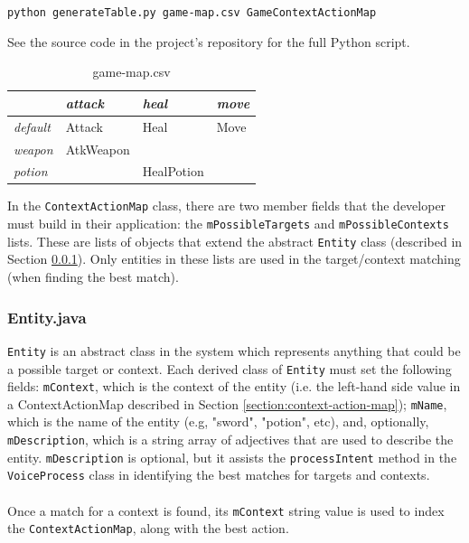 \documentclass[12pt]{article}
\begin{document}
\begin{center}
\texttt{python generateTable.py game-map.csv GameContextActionMap}
\end{center}

See the source code in the project's repository for the full Python script.

\begin{table}[H]
\centering
\caption{game-map.csv}
\label{table:game-map-csv}
\begin{tabular}{l|l|l|l|}
\cline{1-4}
\multicolumn{1}{|l|}{\textbf{}} & \textit{attack}    & \textit{heal}  & \textit{move}    \\ \hline
\multicolumn{1}{|l|}{\textit{default}} & Attack    & Heal  & Move    \\ \hline
\multicolumn{1}{|l|}{\textit{weapon}}  & AtkWeapon &            &  \\ \hline
\multicolumn{1}{|l|}{\textit{potion}}  &                & HealPotion &              \\ \hline
\end{tabular}
\end{table}

In the \texttt{ContextActionMap} class, there are two member fields that the developer must build in their application: the \texttt{mPossibleTargets} and \texttt{mPossibleContexts} lists. These are lists of objects that extend the abstract \texttt{Entity} class (described in Section \ref{section:entity}). Only entities in these lists are used in the target/context matching (when finding the best match).

\subsubsection{Entity.java}
\label{section:entity}

\texttt{Entity} is an abstract class in the system which represents anything that could be a possible target or context. Each derived class of \texttt{Entity} must set the following fields: \texttt{mContext}, which is the context of the entity (i.e. the left-hand side value in a ContextActionMap described in Section \ref{section:context-action-map}); \texttt{mName}, which is the name of the entity (e.g, "sword", "potion", etc), and, optionally, \texttt{mDescription}, which is a string array of adjectives that are used to describe the entity. \texttt{mDescription} is optional, but it assists the \texttt{processIntent} method in the \texttt{VoiceProcess} class in identifying the best matches for targets and contexts.
\\
\\
Once a match for a context is found, its \texttt{mContext} string value is used to index the \texttt{ContextActionMap}, along with the best action.
\end{document}
